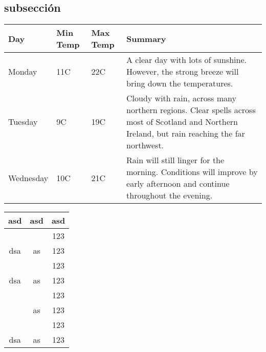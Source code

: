 \subsection{subsecci\'on}
\begin{center}
    \begin{tabular}{ | l | l | l | p{5cm} |}
    \hline
    Day & Min Temp & Max Temp & Summary \\ \hline
    Monday & 11C & 22C & A clear day with lots of sunshine.
    However, the strong breeze will bring down the temperatures. \\ \hline
    Tuesday & 9C & 19C & Cloudy with rain, across many northern regions. Clear spells
    across most of Scotland and Northern Ireland,
    but rain reaching the far northwest. \\ \hline
    Wednesday & 10C & 21C & Rain will still linger for the morning.
    Conditions will improve by early afternoon and continue
    throughout the evening. \\
    \hline
    \end{tabular}
\end{center}

\begin{center}
\begin{tabular}{|c|c|c|}
  \hline
  \textbf{asd}     & \textbf{asd} & \textbf{asd}\\\hline\hline
      &			     			  & 123 \\ \cline{3-3}
  dsa& \multirow{-2}{*}{as} & 123\\ \hline
      &			                  & 123 \\ \cline{3-3}
  dsa& \multirow{-2}{*}{as} & 123\\ \hline
              &			& 123\\ \cline{3-3}
                & \multirow{-2}{*}{as} & 123\\ \cline{2-2}\cline{3-3}
               & 			&123\\ \cline{3-3}
  \multirow{-4}{*}{dsa} & \multirow{-2}{*}{as} & 123\\\hline
\end{tabular}
\end{center}

\newcommand{\mc}[1]{\multicolumn{1}{c}{#1}}

